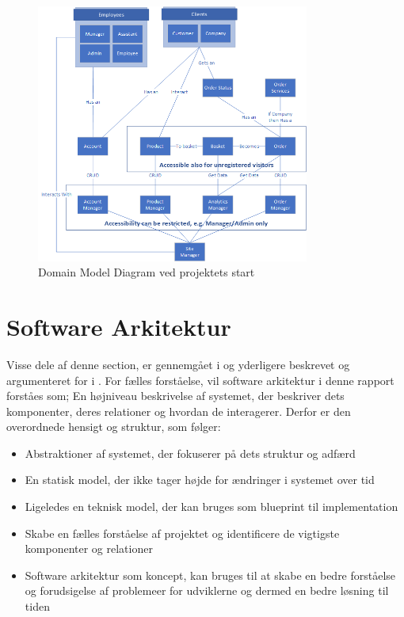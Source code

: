 \begin{figure}
    \centering
    \includegraphics[width=0.8\textwidth]{figures/diagrams/dmd-start.png}
    \caption{Domain Model Diagram ved projektets start}
    \label{fig:domain-model-diagram}
\end{figure}

\section{Software Arkitektur}
Visse dele af denne section, er gennemgået i  og yderligere beskrevet og argumenteret for i . 
For fælles forståelse, vil software arkitektur i denne rapport forståes som; En højniveau beskrivelse af systemet, der beskriver dets komponenter, deres relationer og hvordan de interagerer. Derfor er den overordnede hensigt og struktur, som følger:
\begin{itemize}
    \item Abstraktioner af systemet, der fokuserer på dets struktur og adfærd
    \item En statisk model, der ikke tager højde for ændringer i systemet over tid
    \item Ligeledes en teknisk model, der kan bruges som blueprint til implementation
    \item Skabe en fælles forståelse af projektet og identificere de vigtigste komponenter og relationer
    \item Software arkitektur som koncept, kan bruges til at skabe en bedre forståelse og forudsigelse af problemeer for udviklerne og dermed en bedre løsning til tiden
\end{itemize}

